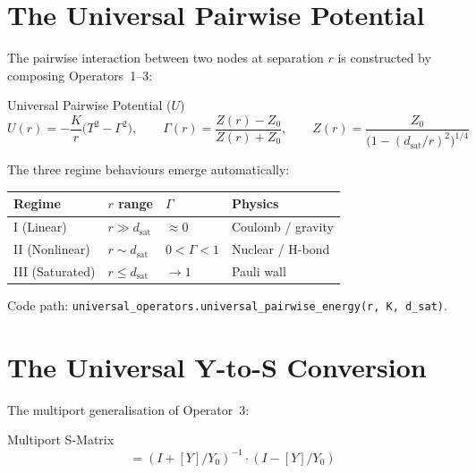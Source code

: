 \section{The Universal Pairwise Potential}
\label{sec:universal_pairwise}

The pairwise interaction between two nodes at separation $r$ is constructed
by composing Operators~1--3:

\begin{resultbox}{Universal Pairwise Potential ($U$)}
\begin{equation}
    U(r) = -\frac{K}{r}\bigl(T^2 - \Gamma^2\bigr), \qquad
    \Gamma(r) = \frac{Z(r) - Z_0}{Z(r) + Z_0}, \qquad
    Z(r) = \frac{Z_0}{\bigl(1 - (d_\text{sat}/r)^2\bigr)^{1/4}}
    \label{eq:universal_pairwise}
\end{equation}
\end{resultbox}

The three regime behaviours emerge automatically:
\begin{center}\small
\begin{tabular}{llll}
\toprule
\textbf{Regime} & \textbf{$r$ range} & \textbf{$\Gamma$}
  & \textbf{Physics} \\
\midrule
I (Linear) & $r \gg d_\text{sat}$ & $\approx 0$ & Coulomb / gravity \\
II (Nonlinear) & $r \sim d_\text{sat}$ & $0 < \Gamma < 1$ & Nuclear / H-bond \\
III (Saturated) & $r \leq d_\text{sat}$ & $\to 1$ & Pauli wall \\
\bottomrule
\end{tabular}
\end{center}

Code path: \texttt{universal\_operators.universal\_pairwise\_energy(r, K, d\_sat)}.

\section{The Universal Y-to-S Conversion}
\label{sec:universal_y_to_s}

The multiport generalisation of Operator~3:
\begin{resultbox}{Multiport S-Matrix}
\begin{equation}
    [S] = (I + [Y]/Y_0)^{-1} \cdot (I - [Y]/Y_0)
    \label{eq:y_to_s}
\end{equation}
\end{resultbox}

